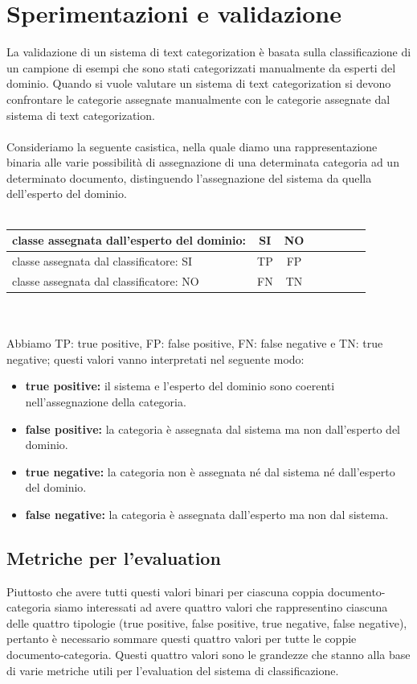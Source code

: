 \documentclass{article}
\theoremstyle{plain}
\theoremstyle{definition}
\begin{document}
\section{Sperimentazioni e validazione}
La validazione di un sistema di text categorization è basata sulla classificazione di un campione di esempi che sono stati categorizzati manualmente da esperti del dominio. Quando si vuole valutare un sistema di text categorization si devono confrontare le categorie assegnate manualmente con le categorie assegnate dal sistema di text categorization.
\\
\\
Consideriamo la seguente casistica, nella quale diamo una rappresentazione binaria alle varie possibilità di assegnazione di una determinata categoria ad un determinato documento, distinguendo l'assegnazione del sistema da quella dell'esperto del dominio.
\\
\\
\begin{tabular}{l*{6}{c}r}
classe assegnata dall'esperto del dominio:  & SI & NO \\
\hline
classe assegnata dal classificatore: SI & TP & FP \\
classe assegnata dal classificatore: NO & FN & TN \\
\end{tabular}
\\
\\
Abbiamo TP: true positive, FP: false positive, FN: false negative e TN: true negative; questi valori vanno interpretati nel seguente modo:
\begin{itemize}
\item \textbf{true positive:} il sistema e l'esperto del dominio sono coerenti nell'assegnazione della categoria.
\item \textbf{false positive:} la categoria è assegnata dal sistema ma non dall'esperto del dominio.
\item  \textbf{true negative:} la categoria non è assegnata né dal sistema né dall'esperto del dominio.
\item \textbf{false negative:} la categoria è assegnata dall'esperto ma non dal sistema.
\end{itemize}


\subsection{Metriche per l'evaluation}
Piuttosto che avere tutti questi valori binari per ciascuna coppia documento-categoria siamo interessati ad avere quattro valori che rappresentino ciascuna delle quattro tipologie (true positive, false positive, true negative, false negative), pertanto è necessario sommare questi quattro valori per tutte le coppie documento-categoria. Questi quattro valori sono le grandezze che stanno alla base di varie metriche utili per l'evaluation del sistema di classificazione.
\end{document}
